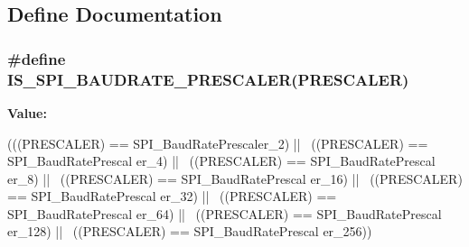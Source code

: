 \subsection{Define Documentation}
\hypertarget{group__SPI__BaudRate__Prescaler_gae79f46ed9f91e39dc1f6912cb25fc716}{
\subsubsection[{IS\_\-SPI\_\-BAUDRATE\_\-PRESCALER}]{\setlength{\rightskip}{0pt plus 5cm}\#define IS\_\-SPI\_\-BAUDRATE\_\-PRESCALER(PRESCALER)}}
\label{group__SPI__BaudRate__Prescaler_gae79f46ed9f91e39dc1f6912cb25fc716}
{\bfseries Value:}
\begin{DoxyCode}
(((PRESCALER) == SPI_BaudRatePrescaler_2) || \
                                              ((PRESCALER) == SPI_BaudRatePrescal
      er_4) || \
                                              ((PRESCALER) == SPI_BaudRatePrescal
      er_8) || \
                                              ((PRESCALER) == SPI_BaudRatePrescal
      er_16) || \
                                              ((PRESCALER) == SPI_BaudRatePrescal
      er_32) || \
                                              ((PRESCALER) == SPI_BaudRatePrescal
      er_64) || \
                                              ((PRESCALER) == SPI_BaudRatePrescal
      er_128) || \
                                              ((PRESCALER) == SPI_BaudRatePrescal
      er_256))
\end{DoxyCode}
